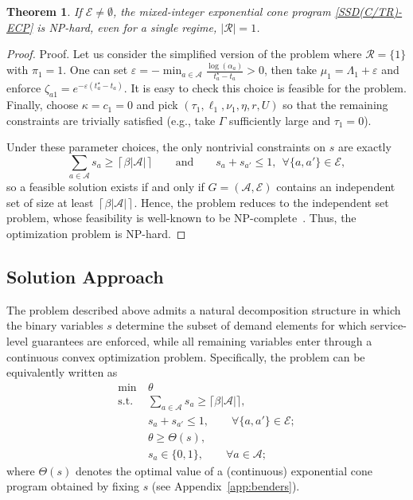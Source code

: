 \documentclass[letter,11pt, reqno]{amsart}
\newtheorem{theorem}{Theorem}
\def\A{\mathcal{A}}
\def\RR{\mathcal{R}}
\begin{document}
\begin{theorem}\label{th:np-hardness}
    If $\mathcal{E}\neq \emptyset$, the mixed-integer exponential cone program \ref{SSD(C/TR)-ECP} is {\rm NP}-hard, even for a single regime, $|\RR|=1$.
\end{theorem}
 
\begin{proof}{Proof.}
    Let us consider the simplified version of the problem where $\RR=\{1\}$ with
$\pi_1=1$. One can set $\varepsilon=-\min_{a\in\A}\frac{\log(\alpha_a)}{t^\star_a-t_a}>0$, then take $\mu_1=\Lambda_1+\varepsilon$ and enforce $\zeta_{a1}=e^{-\varepsilon(t^\star_a-t_a)}$. It is easy to check this choice is feasible for the problem. Finally, choose $\kappa=c_1=0$ and pick $(\tau_1,\ell_1,\nu_1,\eta,r,U)$ so that the remaining constraints are trivially satisfied (e.g., take $\Gamma$ sufficiently large and $\tau_1=0$).

Under these parameter choices, the only nontrivial constraints on $s$ are exactly
$$
\sum_{a\in\mathcal A}s_a\ge \left\lceil\beta |\A|\right\rceil 
\qquad\text{and}\qquad
s_a+s_{a'}\le 1,\ \ \forall \{a,a'\}\in\mathcal{E},
$$
so a feasible solution exists if and only if $G=(\A,\mathcal{E})$ contains an independent set of
size at least $\left\lceil\beta |\A|\right\rceil$. Hence, the problem reduces to the independent set problem, whose feasibility is well-known to be NP-complete~\citep[see, e.g.,][]{garey2002computers}. Thus, the
optimization problem is NP-hard.%
\end{proof}

\subsection{Solution Approach}\label{sec:benders}

The problem described above admits a natural decomposition structure in which
the binary variables $s$ determine the subset of demand elements for which
service-level guarantees are enforced, while all remaining variables enter
through a continuous convex optimization problem.
Specifically, the problem can be equivalently written as
\begin{align*}
\min \ & \theta\\
\text{s.t. } 
& \sum_{a\in\mathcal{A}} s_a \ge \lceil \beta |\mathcal{A}| \rceil,\\
& s_a + s_{a'} \le 1, \qquad \forall \{a,a'\}\in\mathcal{E};\\
& \theta \ge \Theta(s),\\
& s_a \in \{0,1\}, \qquad \forall a\in\mathcal{A};
\end{align*}
where $\Theta(s)$ denotes the optimal value of a (continuous) exponential cone
program obtained by fixing $s$ (see Appendix~\ref{app:benders}).
\end{document}

